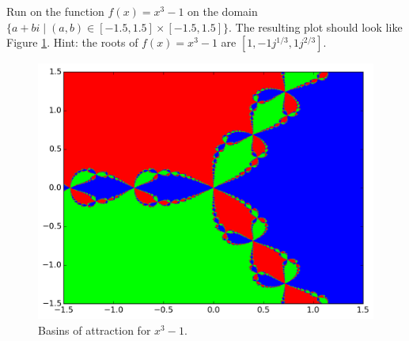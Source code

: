 \begin{problem}

Run  on the function $f(x) = x^3-1$ on the domain $\{a+bi \mid (a, b) \in [-1.5, 1.5] \times [-1.5, 1.5] \}$.
The resulting plot should look like Figure \ref{fig:fractal_hw}.  Hint: the roots of $f(x) = x^3-1$ are $[1,-1j^{1/3},1j^{2/3}]$.


\begin{figure}[H]
\begin{center}
\includegraphics[scale=0.66]{figures/fractal_hw}
\caption{Basins of attraction for $x^3-1$.}
\label{fig:fractal_hw}
\end{center}
\end{figure}
\end{problem}

